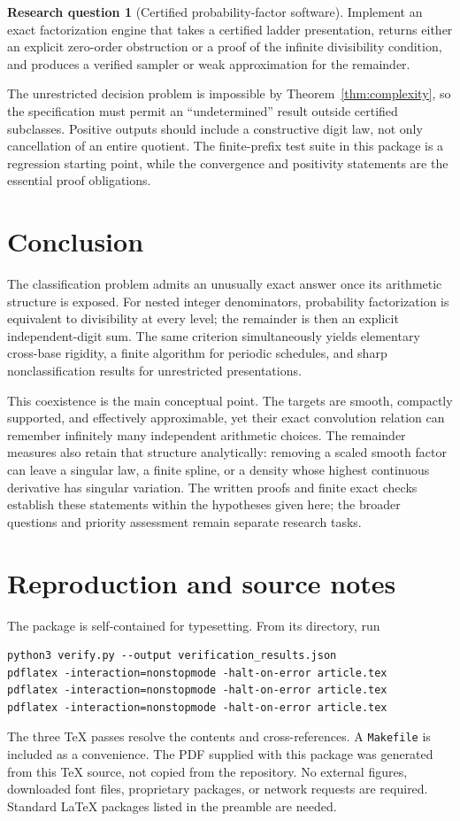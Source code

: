 \documentclass[11pt,a4paper]{article}
\theoremstyle{definition}
\newtheorem{question}{Research question}
\theoremstyle{remark}
\begin{document}
\begin{question}[Certified probability-factor software]
Implement an exact factorization engine that takes a certified ladder
presentation, returns either an explicit zero-order obstruction or a
proof of the infinite divisibility condition, and produces a verified
sampler or weak approximation for the remainder.
\end{question}
The unrestricted decision problem is impossible by
Theorem~\ref{thm:complexity}, so the specification must permit an
``undetermined'' result outside certified subclasses. Positive outputs
should include a constructive digit law, not only cancellation of an
entire quotient. The finite-prefix test suite in this package is a
regression starting point, while the convergence and positivity statements
are the essential proof obligations.

\section{Conclusion}
The classification problem admits an unusually exact answer once its
arithmetic structure is exposed. For nested integer denominators,
probability factorization is equivalent to divisibility at every level;
the remainder is then an explicit independent-digit sum. The same criterion
simultaneously yields elementary cross-base rigidity, a finite algorithm
for periodic schedules, and sharp nonclassification results for unrestricted
presentations.

This coexistence is the main conceptual point. The targets are smooth,
compactly supported, and effectively approximable, yet their exact
convolution relation can remember infinitely many independent arithmetic
choices. The remainder measures also retain that structure analytically:
removing a scaled smooth factor can leave a singular law, a finite spline,
or a density whose highest continuous derivative has singular variation.
The written proofs and finite exact checks establish these statements
within the hypotheses given here; the broader questions and priority
assessment remain separate research tasks.

\appendix
\section{Reproduction and source notes}
\label{sec:reproduction}
The package is self-contained for typesetting. From its directory, run
\begin{verbatim}
python3 verify.py --output verification_results.json
pdflatex -interaction=nonstopmode -halt-on-error article.tex
pdflatex -interaction=nonstopmode -halt-on-error article.tex
pdflatex -interaction=nonstopmode -halt-on-error article.tex
\end{verbatim}
The three TeX passes resolve the contents and cross-references. A
\texttt{Makefile} is included as a convenience. The PDF supplied with this
package was generated from this TeX source, not copied from the repository.
No external figures, downloaded font files, proprietary packages, or network
requests are required. Standard LaTeX packages listed in the preamble are
needed.
\end{document}
